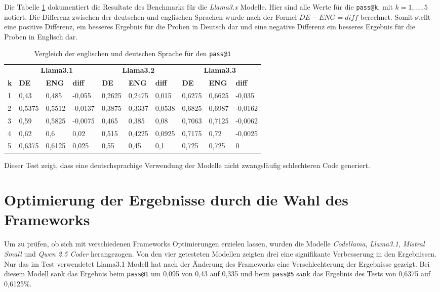 Die Tabelle \ref{tab:prompt_results_llama_x_by_lang} dokumentiert die Resultate des Benchmarks für die \textit{Llama3.x} Modelle. Hier sind alle Werte für die \texttt{pass@k}, mit $k=1,...,5$ notiert. Die Differenz zwischen der deutschen und englischen Sprachen wurde nach der Formel $DE - ENG = diff$ berechnet. Somit stellt eine positive Differenz, ein besseres Ergebnis für die Proben in Deutsch dar und eine negative Differenz ein besseres Ergebnis für die Proben in Englisch dar.\vspace{0.2cm}

\begin{table}[!ht]
	\begin{tabular}{|l|lll|lll|lll|}
		\hline
		& \multicolumn{3}{c|}{\textbf{Llama3.1}} & \multicolumn{3}{c|}{\textbf{Llama3.2}} & \multicolumn{3}{c|}{\textbf{Llama3.3}} \\
		\textbf{k} & \textbf{DE} & \textbf{ENG} & \textbf{diff} & \textbf{DE} & \textbf{ENG} & \textbf{diff} & \textbf{DE} & \textbf{ENG} & \textbf{diff} \\
		\hline
		1 & 0,43 & 0,485 & -0,055     & 0,2625 & 0,2475 & 0,015  & 0,6275 & 0,6625 & -0,035 \\
		2 & 0,5375 & 0,5512 & -0,0137 & 0,3875 & 0,3337 & 0,0538 & 0,6825 & 0,6987 & -0,0162 \\
		3 & 0,59 & 0,5825 & -0,0075   & 0,465 & 0,385 & 0,08     & 0,7063 & 0,7125 & -0,0062 \\
		4 & 0,62 & 0,6 & 0,02         & 0,515 & 0,4225 & 0,0925  & 0,7175 & 0,72 & -0,0025 \\
		5 & 0,6375 & 0,6125 & 0,025   & 0,55 & 0,45 & 0,1        & 0,725 & 0,725 & 0 \\
		\hline
		\hline
	\end{tabular}
	\centering
	\label{tab:prompt_results_llama_x_by_lang}
	\caption{Vergleich der englischen und deutschen Sprache für den \texttt{pass@1}}
\end{table}

Dieser Test zeigt, dass eine deutschsprachige Verwendung der Modelle nicht zwangsläufig schlechteren Code generiert.



\section{Optimierung der Ergebnisse durch die Wahl des Frameworks}
Um zu prüfen, ob sich mit verschiedenen Frameworks Optimierungen erzielen lassen, wurden die Modelle \textit{Codellama}, \textit{Llama3.1}, \textit{Mistral Small} und \textit{Qwen 2.5 Coder} herangezogen. Von den vier getesteten Modellen zeigten drei eine signifikante Verbesserung in den Ergebnissen. Nur das im Test verwendetet Llama3.1 Modell hat nach der Änderung des Frameworks eine Verschlechterung der Ergebnisse gezeigt. Bei diesem Modell sank das Ergebnis beim \texttt{pass@1} um 0,095 von 0,43 auf 0,335 und beim \texttt{pass@5} sank das Ergebnis des Tests von 0,6375 auf 0,6125\%.\vspace{0.2cm}

